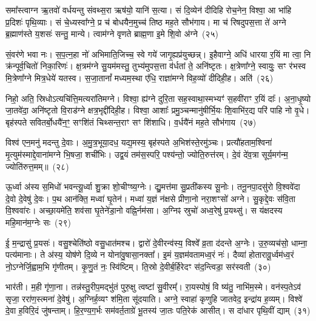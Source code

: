 समा᳚स्त्वाग्न ऋ॒तवो॑ वर्धयन्तु संवथ्स॒रा ऋष॑यो॒ यानि॑ स॒त्या। सं दि॒व्येन॑ दीदिहि रोच॒नेन॒ विश्वा॒ आ भा॑हि प्र॒दिशः॑ पृथि॒व्याः। सं चे॒ध्यस्वा᳚ग्ने॒ प्र च॑ बोधयैन॒मुच्च॑ तिष्ठ मह॒ते सौभ॑गाय। मा च॑ रिषदुपस॒त्ता ते॑ अग्ने ब्र॒ह्माण॑स्ते य॒शसः॑ सन्तु॒ मान्ये। त्वाम॑ग्ने वृणते ब्राह्म॒णा इ॒मे शि॒वो अ॑ग्ने~(२५)

सं॒वर॑णे भवा नः। स॒प॒त्न॒हा नो॑ अभिमाति॒जिच्च॒ स्वे गये॑ जागृ॒ह्यप्र॑युच्छन्न्। इ॒हैवाग्ने॒ अधि॑ धारया र॒यिं मा त्वा॒ नि क्र॑न्पूर्व॒चितो॑ निका॒रिणः॑। क्ष॒त्रम॑ग्ने सु॒यम॑मस्तु॒ तुभ्य॑मुपस॒त्ता व॑र्धतां ते॒ अनि॑ष्टृतः। क्ष॒त्रेणा᳚ग्ने॒ स्वायुः॒ सꣳ र॑भस्व मि॒त्रेणा᳚ग्ने मित्र॒धेये॑ यतस्व। स॒जा॒तानां᳚ मध्यम॒स्था ए॑धि॒ राज्ञा॑मग्ने विह॒व्यो॑ दीदिही॒ह। अति॑~(२६)

निहो॒ अति॒ स्रिधो\-ऽत्यचि॑त्ति॒मत्यरा॑तिमग्ने। विश्वा॒ ह्य॑ग्ने दुरि॒ता सह॒स्वाथा॒स्मभ्यꣳ॑ स॒हवी॑राꣳ र॒यिं दाः᳚। अ॒ना॒धृ॒ष्यो जा॒तवे॑दा॒ अनि॑ष्टृतो वि॒राड॑ग्ने क्षत्र॒भृद्दी॑दिही॒ह। विश्वा॒ आशाः᳚ प्रमु॒ञ्चन्मानु॑षीर्भि॒यः शि॒वाभि॑र॒द्य परि॑ पाहि नो वृ॒धे। बृह॑स्पते सवितर्बो॒धयै॑न॒ꣳ॒ सꣳशि॑तं चिथ्सन्त॒राꣳ सꣳ शि॑शाधि। व॒र्धयै॑नं मह॒ते सौभ॑गाय~(२७)

विश्व॑ एन॒मनु॑ मदन्तु दे॒वाः। अ॒मु॒त्र॒भूया॒दध॒ यद्य॒मस्य॒ बृह॑स्पते अ॒भिश॑स्ते॒रमु॑ञ्चः। प्रत्यौ॑हताम॒श्विना॑ मृ॒त्युम॑स्माद्दे॒वाना॑मग्ने भि॒षजा॒ शची॑भिः। उद्व॒यं तम॑स॒स्परि॒ पश्य॑न्तो॒ ज्योति॒रुत्त॑रम्। दे॒वं दे॑व॒त्रा सूर्य॒मग॑न्म॒ ज्योति॑रुत्त॒मम्॥~(२८)

{\anuvakamend[{इ॒मे शि॒वो अ॒ग्ने\-ऽति॒ सौभ॑गाय॒ चतु॑स्त्रिꣳशच्च}]}%

ऊ॒र्ध्वा अ॑स्य स॒मिधो॑ भवन्त्यू॒र्ध्वा शु॒क्रा शो॒चीꣳष्य॒ग्नेः। द्यु॒मत्त॑मा सु॒प्रती॑कस्य सू॒नोः। तनू॒नपा॒दसु॑रो वि॒श्ववे॑दा दे॒वो दे॒वेषु॑ दे॒वः। प॒थ आन॑क्ति॒ मध्वा॑ घृ॒तेन॑। मध्वा॑ य॒ज्ञं न॑क्षसे प्रीणा॒नो नरा॒शꣳसो॑ अग्ने। सु॒कृद्दे॒वः स॑वि॒ता वि॒श्ववा॑रः। अच्छा॒यमे॑ति॒ शव॑सा घृ॒तेने॑डा॒नो वह्नि॒र्नम॑सा। अ॒ग्निꣴ स्रुचो॑ अध्व॒रेषु॑ प्र॒यथ्सु॑। स य॑क्षदस्य महि॒मान॑म॒ग्नेः सः~(२९)

ई॒ म॒न्द्रासु॑ प्र॒यसः॑। वसु॒श्चेति॑ष्ठो वसु॒धात॑मश्च। द्वारो॑ दे॒वीरन्व॑स्य॒ विश्वे᳚ व्र॒ता द॑दन्ते अ॒ग्नेः। उ॒रु॒व्यच॑सो॒ धाम्ना॒ पत्य॑मानाः। ते अ॑स्य॒ योष॑णे दि॒व्ये न योना॑वु॒षासा॒नक्ता᳚। इ॒मं य॒ज्ञम॑वतामध्व॒रं नः॑। दैव्या॑ होतारावू॒र्ध्वम॑ध्व॒रं नो॒\-ऽग्नेर्जि॒ह्वाम॒भि गृ॑णीतम्। कृ॒णु॒तं नः॒ स्वि॑ष्टिम्। ति॒स्रो दे॒वीर्ब॒र्हिरेदꣳ स॑द॒न्त्विडा॒ सर॑स्वती~(३०)

भार॑ती। म॒ही गृ॑णा॒ना। तन्न॑स्तु॒रीप॒मद्भु॑तं पुरु॒क्षु त्वष्टा॑ सु॒वीरम्᳚। रा॒यस्पोषं॒ वि ष्य॑तु॒ नाभि॑म॒स्मे। वन॑स्प॒ते\-ऽव॑ सृजा॒ ररा॑ण॒स्त्मना॑ दे॒वेषु॑। अ॒ग्निर्\mbox{}ह॒व्यꣳ श॑मि॒ता सू॑दयाति। अग्ने॒ स्वाहा॑ कृणुहि जातवेद॒ इन्द्रा॑य ह॒व्यम्। विश्वे॑ दे॒वा ह॒विरि॒दं जु॑षन्ताम्। हि॒र॒ण्य॒ग॒र्भः सम॑वर्त॒ताग्रे॑ भू॒तस्य॑ जा॒तः पति॒रेक॑ आसीत्। स दा॑धार पृथि॒वीं द्याम्~(३१)

